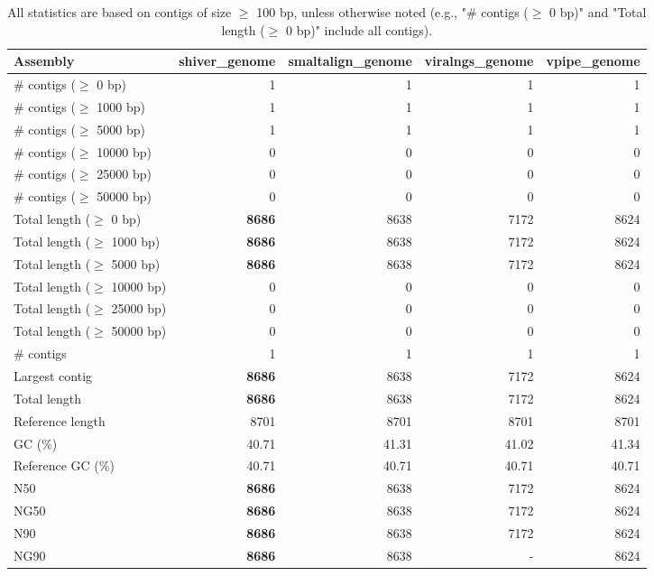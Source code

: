 \documentclass[12pt,a4paper]{article}
\begin{document}
\begin{table}[ht]
\begin{center}
\caption{All statistics are based on contigs of size $\geq$ 100 bp, unless otherwise noted (e.g., "\# contigs ($\geq$ 0 bp)" and "Total length ($\geq$ 0 bp)" include all contigs).}
\begin{tabular}{|l*{4}{|r}|}
\hline
Assembly & shiver\_genome & smaltalign\_genome & viralngs\_genome & vpipe\_genome \\ \hline
\# contigs ($\geq$ 0 bp) & 1 & 1 & 1 & 1 \\ \hline
\# contigs ($\geq$ 1000 bp) & 1 & 1 & 1 & 1 \\ \hline
\# contigs ($\geq$ 5000 bp) & 1 & 1 & 1 & 1 \\ \hline
\# contigs ($\geq$ 10000 bp) & 0 & 0 & 0 & 0 \\ \hline
\# contigs ($\geq$ 25000 bp) & 0 & 0 & 0 & 0 \\ \hline
\# contigs ($\geq$ 50000 bp) & 0 & 0 & 0 & 0 \\ \hline
Total length ($\geq$ 0 bp) & {\bf 8686} & 8638 & 7172 & 8624 \\ \hline
Total length ($\geq$ 1000 bp) & {\bf 8686} & 8638 & 7172 & 8624 \\ \hline
Total length ($\geq$ 5000 bp) & {\bf 8686} & 8638 & 7172 & 8624 \\ \hline
Total length ($\geq$ 10000 bp) & 0 & 0 & 0 & 0 \\ \hline
Total length ($\geq$ 25000 bp) & 0 & 0 & 0 & 0 \\ \hline
Total length ($\geq$ 50000 bp) & 0 & 0 & 0 & 0 \\ \hline
\# contigs & 1 & 1 & 1 & 1 \\ \hline
Largest contig & {\bf 8686} & 8638 & 7172 & 8624 \\ \hline
Total length & {\bf 8686} & 8638 & 7172 & 8624 \\ \hline
Reference length & 8701 & 8701 & 8701 & 8701 \\ \hline
GC (\%) & 40.71 & 41.31 & 41.02 & 41.34 \\ \hline
Reference GC (\%) & 40.71 & 40.71 & 40.71 & 40.71 \\ \hline
N50 & {\bf 8686} & 8638 & 7172 & 8624 \\ \hline
NG50 & {\bf 8686} & 8638 & 7172 & 8624 \\ \hline
N90 & {\bf 8686} & 8638 & 7172 & 8624 \\ \hline
NG90 & {\bf 8686} & 8638 & - & 8624 \\ \hline

\end{tabular}
\end{center}
\end{table}
\end{document}
